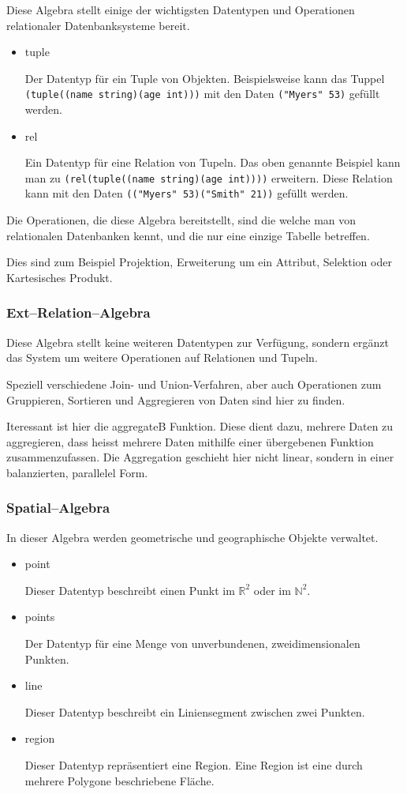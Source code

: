 Diese Algebra stellt einige der wichtigsten Datentypen und Operationen relationaler Datenbanksysteme bereit.
 
\begin{itemize}
\item tuple

Der Datentyp für ein Tuple von Objekten. Beispielsweise kann das Tuppel\\ \verb+(tuple((name string)(age int)))+ mit den Daten \verb+("Myers" 53)+ gefüllt werden.
\item rel

Ein Datentyp für eine Relation von Tupeln. Das oben genannte Beispiel kann man zu \verb+(rel(tuple((name string)(age int))))+ erweitern. Diese Relation kann mit den Daten \verb+(("Myers" 53)("Smith" 21))+ gefüllt werden.
\end{itemize}
Die Operationen, die diese Algebra bereitstellt, sind die welche man von relationalen Datenbanken kennt, und die nur eine einzige Tabelle betreffen.

Dies sind zum Beispiel Projektion, Erweiterung um ein Attribut, Selektion oder Kartesisches Produkt.

\subsubsection{Ext--Relation--Algebra}

Diese Algebra stellt keine weiteren Datentypen zur Verfügung, sondern ergänzt das System um weitere Operationen auf Relationen und Tupeln. 

Speziell verschiedene Join- und Union-Verfahren, aber auch Operationen zum Gruppieren, Sortieren und Aggregieren von Daten sind hier zu finden.

Iteressant ist hier die aggregateB Funktion. Diese dient dazu, mehrere Daten zu aggregieren, dass heisst mehrere Daten mithilfe einer übergebenen Funktion zusammenzufassen. Die Aggregation geschieht hier nicht linear, sondern in einer balanzierten, parallelel Form. 

\subsubsection{Spatial--Algebra}
In dieser Algebra werden geometrische und geographische Objekte verwaltet.
\begin{itemize}
\item point

Dieser Datentyp beschreibt einen Punkt im $\mathbb{R}^2$ oder im $\mathbb{N}^2$.
\item points

Der Datentyp für eine Menge von unverbundenen, zweidimensionalen Punkten. 
\item line

Dieser Datentyp beschreibt ein Liniensegment zwischen zwei Punkten.
\item region

Dieser Datentyp repräsentiert eine Region. Eine Region ist eine durch mehrere Polygone beschriebene Fläche.
\end{itemize}

